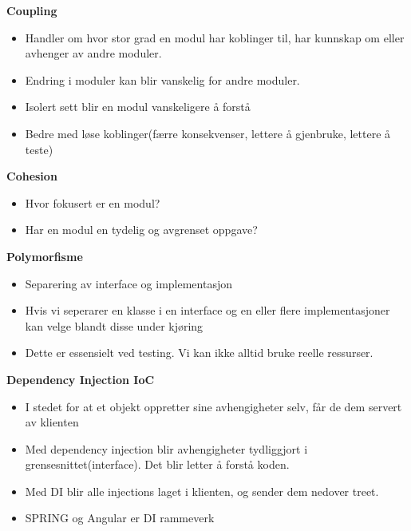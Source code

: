 \documentclass{article}
\begin{document}
\begin{flushleft}
        \bigskip
        \textbf{Coupling}
        \begin{itemize}
            \item Handler om hvor stor grad en modul har koblinger til, har kunnskap om eller avhenger av andre moduler.
            \item Endring i moduler kan blir vanskelig for andre moduler.
            \item Isolert sett blir en modul vanskeligere å forstå
            \item Bedre med løse koblinger(færre konsekvenser, lettere å gjenbruke, lettere å teste)
        \end{itemize}

        \textbf{Cohesion}
        \begin{itemize}
            \item Hvor fokusert er en modul?
            \item Har en modul en tydelig og avgrenset oppgave? 
        \end{itemize}


        \textbf{Polymorfisme}
        \begin{itemize}
            \item Separering av interface og implementasjon
            \item Hvis vi seperarer en klasse i en interface og en eller flere implementasjoner kan velge blandt disse under kjøring
            \item Dette er essensielt ved testing. Vi kan ikke alltid bruke reelle ressurser.
        \end{itemize}

        \textbf{Dependency Injection IoC}
        \begin{itemize}
            \item I stedet for at et objekt oppretter sine avhengigheter selv, får de dem servert av klienten
            \item Med dependency injection blir avhengigheter tydliggjort i grensesnittet(interface). Det blir letter å forstå koden.
            \item Med DI blir alle injections laget i klienten, og sender dem nedover treet. 
            \item SPRING og Angular er DI rammeverk
        \end{itemize}


\end{flushleft}
\end{document}

